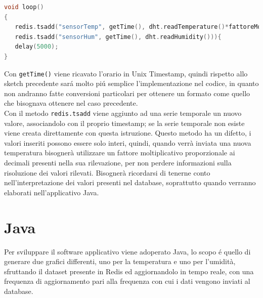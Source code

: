 \begin{enumerate}
\begin{lstlisting}[autogobble, style=c, language=C]
void loop()
{
   redis.tsadd("sensorTemp", getTime(), dht.readTemperature()*fattoreMoltiplicativoTemp))
   redis.tsadd("sensorHum", getTime(), dht.readHumidity())){
   delay(5000);
}\end{lstlisting}

    Con \texttt{getTime()} viene ricavato l'orario in Unix Timestamp, quindi rispetto allo sketch precedente
    sará molto piú semplice l'implementazione nel codice, in quanto non andranno fatte conversioni particolari per ottenere
    un formato come quello che bisognava ottenere nel caso precedente.\\
    Con il metodo \texttt{redis.tsadd} viene aggiunto ad una serie temporale un nuovo valore, associandolo con il proprio timestamp;
    se la serie temporale non esiste viene creata direttamente con questa istruzione.
    Questo metodo ha un difetto, i valori inseriti possono essere solo interi, quindi, quando verrà inviata
    una nuova temperatura bisognerà utilizzare un fattore moltiplicativo proporzionale ai decimali presenti nella sua rilevazione, per non perdere informazioni sulla
    risoluzione dei valori rilevati.
    Bisognerà ricordarsi di tenerne conto nell'interpretazione dei valori presenti nel database, soprattutto quando
    verranno elaborati nell'applicativo Java.
\end{enumerate}


\section{Java}
Per sviluppare il software applicativo viene adoperato Java, lo scopo é quello di generare due grafici differenti,
uno per la temperatura e uno per l'umidità, sfruttando il dataset presente in Redis ed aggiornandolo in tempo reale, con
una frequenza di aggiornamento pari alla frequenza con cui i dati vengono inviati al database.


